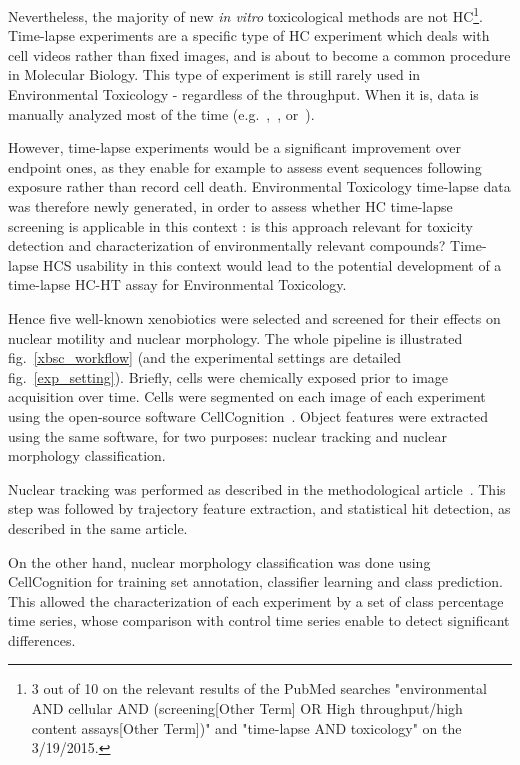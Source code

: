 Nevertheless, the majority of new \textit{in vitro} toxicological methods are not HC\footnote{3 out of 10 on the relevant results of the PubMed searches "environmental AND cellular AND (screening[Other Term] OR High throughput/high content assays[Other Term])" and "time-lapse AND toxicology" on the 3/19/2015.}. Time-lapse experiments are a specific type of HC experiment which deals with cell videos rather than fixed images, and is about to become a common procedure in Molecular Biology. This type of experiment is still rarely used in Environmental Toxicology - regardless of the throughput. When it is, data is manually analyzed most of the time (e.g.~\cite{pmid17949680},~\cite{pmid15388243}, or~\cite{pmid24263567}).

However, time-lapse experiments would be a significant improvement over endpoint ones, as they enable for example to assess event sequences following exposure rather than record cell death. Environmental Toxicology time-lapse data was therefore newly generated, in order to assess whether HC time-lapse screening is applicable in this context : is this approach relevant for toxicity detection and characterization of environmentally relevant compounds? Time-lapse HCS usability in this context would lead to the potential development of a time-lapse HC-HT assay for Environmental Toxicology. %

Hence five well-known xenobiotics were selected and screened for their effects on nuclear motility and nuclear morphology. The whole pipeline is illustrated fig.~\ref{xbsc_workflow} (and the experimental settings are detailed fig.~\ref{exp_setting}). Briefly, cells were chemically exposed prior to image acquisition over time. Cells were segmented on each image of each experiment using the open-source software CellCognition~\cite{cellcognition}. Object features were extracted using the same software, for two purposes: nuclear tracking and nuclear morphology classification. 

Nuclear tracking was performed as described in the methodological article~\cite{motiw}. This step was followed by trajectory feature extraction, and statistical hit detection, as described in the same article.

On the other hand, nuclear morphology classification was done using CellCognition for training set annotation, classifier learning and class prediction. This allowed the characterization of each experiment by a set of class percentage time series, whose comparison with control time series enable to detect significant differences.

